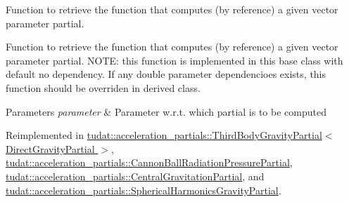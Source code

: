 Function to retrieve the function that computes (by reference) a given vector parameter partial. 

Function to retrieve the function that computes (by reference) a given vector parameter partial. N\+O\+TE\+: this function is implemented in this base class with default no dependency. If any double parameter dependencioes exists, this function should be overriden in derived class. 
\begin{DoxyParams}{Parameters}
{\em parameter} & Parameter w.\+r.\+t. which partial is to be computed \\
\hline
\end{DoxyParams}


Reimplemented in \hyperlink{classtudat_1_1acceleration__partials_1_1ThirdBodyGravityPartial_ac3487afc5a8fd57e4af4c55da1417bca}{tudat\+::acceleration\+\_\+partials\+::\+Third\+Body\+Gravity\+Partial$<$ Direct\+Gravity\+Partial $>$}, \hyperlink{classtudat_1_1acceleration__partials_1_1CannonBallRadiationPressurePartial_afc1fd975481defde6acc5d10f9c38922}{tudat\+::acceleration\+\_\+partials\+::\+Cannon\+Ball\+Radiation\+Pressure\+Partial}, \hyperlink{classtudat_1_1acceleration__partials_1_1CentralGravitationPartial_ae21256b30f9648d48dc6c53805127d22}{tudat\+::acceleration\+\_\+partials\+::\+Central\+Gravitation\+Partial}, and \hyperlink{classtudat_1_1acceleration__partials_1_1SphericalHarmonicsGravityPartial_a4d0928a600be68a36aaa3bc717ca77dd}{tudat\+::acceleration\+\_\+partials\+::\+Spherical\+Harmonics\+Gravity\+Partial}.

